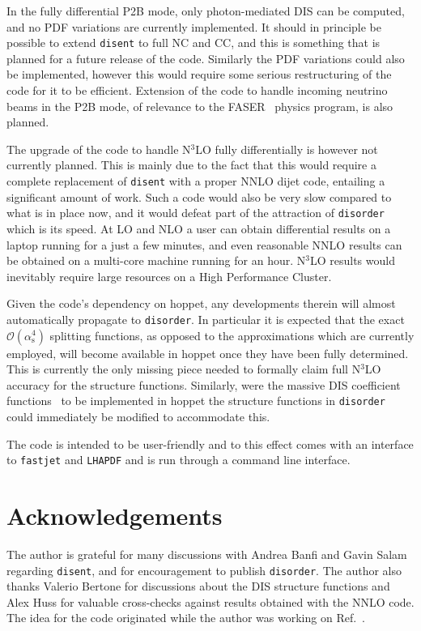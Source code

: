 \documentclass[submission, PhysCodeb]{SciPost_better_arXiv}
\newcommand{\hoppet}{{\sc hoppet}}
\newcommand{\disent}{{\tt disent}}
\newcommand{\disorder}{{\tt disorder}}
\newcommand{\fastjet}{{\tt fastjet}}
\newcommand{\lhapdf}{{\tt LHAPDF}}
\newcommand{\nnlojet}{NNLO{\sc{jet}}}
\newcommand{\as}{\alpha_{\mathrm{s}}}
\newcommand{\NNNLO}{N$^3$LO}
\begin{document}
In the fully differential P2B mode, only photon-mediated DIS can be
computed, and no PDF variations are currently implemented. It should
in principle be possible to extend \disent{} to full NC and CC, and
this is something that is planned for a future release of the
code. Similarly the PDF variations could also be implemented, however
this would require some serious restructuring of the code for it to be
efficient. Extension of the code to handle incoming neutrino beams in
the P2B mode, of relevance to the FASER~\cite{Feng:2017uoz} physics
program, is also planned.

The upgrade of the code to handle \NNNLO{} fully differentially is
however not currently planned. This is mainly due to the fact that
this would require a complete replacement of \disent{} with a proper
NNLO dijet code, entailing a significant amount of
work. Such a code would also be very slow compared to what is in place
now, and it would defeat part of the attraction of \disorder{} which
is its speed. At LO and NLO a user can obtain differential results on
a laptop running for a just a few minutes, and even reasonable NNLO
results can be obtained on a multi-core machine running for an
hour. \NNNLO{} results would inevitably require large resources on a
High Performance Cluster.

Given the code's dependency on \hoppet{}, any developments therein
will almost automatically propagate to \disorder{}. In particular it
is expected that the exact $\mathcal{O}(\as^4)$ splitting functions,
as opposed to the approximations which are currently employed, will
become available in \hoppet{} once they have been fully
determined. This is currently the only missing piece needed to
formally claim full \NNNLO{} accuracy for the structure
functions. Similarly, were the massive DIS coefficient
functions~\cite{Gottschalk:1980rv,Laenen:1992zk,Laenen:1992xs,Gluck:1997sj,Blumlein:2011zu,Behring:2015roa,Berger:2016inr,Gao:2017kkx}
to be implemented in \hoppet{} the structure functions in \disorder{}
could immediately be modified to accommodate this.

The code is intended to be user-friendly and to this effect comes with
an interface to \fastjet{} and \lhapdf{} and is run through a
command line interface. 

\section*{Acknowledgements}
The author is grateful for many discussions with Andrea Banfi and
Gavin Salam regarding \disent{}, and for encouragement to publish
\disorder{}. The author also thanks Valerio Bertone for discussions
about the DIS structure functions and Alex Huss for valuable cross-checks
against results obtained with the \nnlojet{} code. The idea for the
code originated while the author was working on
Ref.~\cite{Banfi:2023mhz}.


%
%



\nolinenumbers
\end{document}

